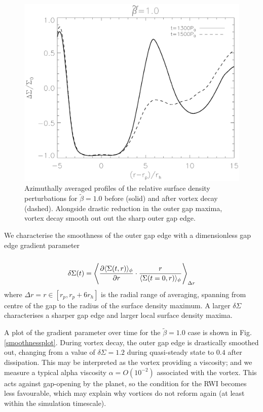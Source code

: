 \begin{figure}
  \includegraphics[width=\linewidth]{figures/gapchange}
  \caption{Azimuthally averaged profiles of the relative surface
    density perturbations for  $\tilde\beta=1.0$
    before (solid) and after vortex decay
    (dashed). Alongside drastic reduction in the outer gap maxima, vortex decay
    smooth out out the sharp outer gap edge.
    \label{gap_smoothed}} 
\end{figure}

We characterise the smoothness of the outer gap edge with a dimensionless
gap edge gradient parameter
\begin{align}
  \delta\Sigma(t)= \la \frac{\partial \langle \Sigma(t,r)
    \rangle_{\phi}}{\partial r} \cdot \frac{r}{\langle \Sigma(t=0,r)
    \rangle_{\phi}} \ra_{\Delta r}  
\end{align}
where $\Delta r = r\in [r_p,r_p + 6r_h]$ is the radial range of averaging, spanning
from centre of the gap to the radius of the surface density maximum.
A larger $\delta \Sigma$ characterises a sharper gap edge and  
larger local surface density maxima.   

A plot of the gradient parameter over time
for the $\tilde\beta=1.0$ case is shown in Fig. \ref{smoothnessplot}.
During vortex decay, the outer gap edge is 
drastically smoothed out, changing from a value of $\delta\Sigma=1.2$ during
quasi-steady state to $0.4$ after dissipation. 
This may be interpreted as the vortex providing a viscosity;  
and we measure a typical alpha viscosity $\alpha = O(10^{-2})$
associated with the vortex. This acts against gap-opening
by the planet, so the condition for the RWI
becomes less favourable, which may explain why vortices do not
reform again (at least within the simulation timescale). 

